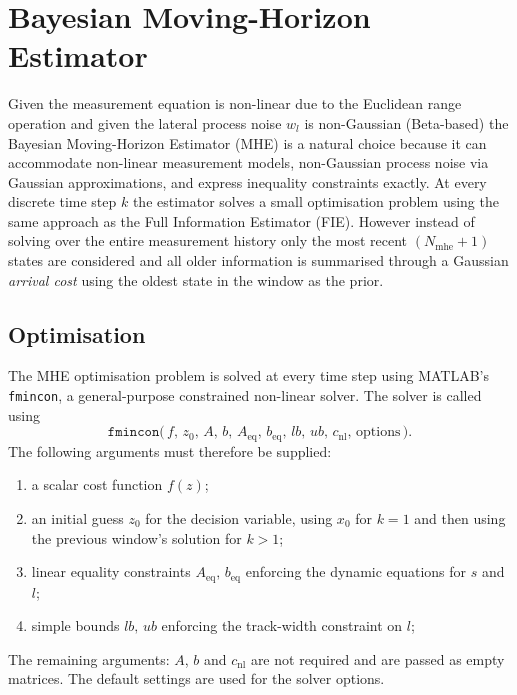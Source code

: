 \documentclass{article}
\begin{document}
\section{Bayesian Moving-Horizon Estimator}
\label{sec:mhe}

 Given the measurement equation is non-linear due to the Euclidean range operation and given the lateral process noise $w_{l}$ is non-Gaussian (Beta-based) the Bayesian Moving-Horizon Estimator (MHE) is a natural choice because it can accommodate non-linear measurement models, non-Gaussian process noise via Gaussian approximations, and express inequality constraints exactly. At every discrete time step $k$ the estimator solves a small optimisation problem using the same approach as the Full Information Estimator (FIE). However instead of solving over the entire measurement history only the most recent $(N_{\text{mhe}}+1)$ states are considered and all older information is summarised through a Gaussian \emph{arrival cost} using the oldest state in the window as the prior. 

\subsection{Optimisation}
\label{subsec:est_fmincon}

The MHE optimisation problem is solved at every time step using MATLAB's \texttt{fmincon}, a general-purpose constrained non-linear solver. The solver is called using
\begin{equation*}
    \texttt{fmincon}\bigl(\,f,\, z_{0},\, A,\, b,\, A_{\text{eq}},\, b_{\text{eq}},\, lb,\, ub,\, c_{\text{nl}},\, \text{options}\,\bigr).
\end{equation*}
The following arguments must therefore be supplied:
\begin{enumerate}
    \item a scalar cost function $f(z)$;
    \item an initial guess $z_{0}$ for the decision variable, using $x_0$ for $k=1$ and then using the previous window's solution for $k>1$;
    \item linear equality constraints $A_{\text{eq}},\, b_{\text{eq}}$ enforcing the dynamic equations for $s$ and $l$;
    \item simple bounds $lb,\, ub$ enforcing the track-width constraint on $l$;
\end{enumerate}
The remaining arguments: $A$, $b$ and $c_{\text{nl}}$ are not required and are passed as empty matrices. The default settings are used for the solver options. 
\end{document}
